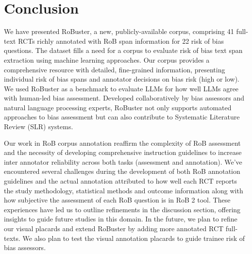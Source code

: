 \documentclass[sn-mathphys,Numbered]{sn-jnl}%
\theoremstyle{thmstyleone}%
\theoremstyle{thmstyletwo}%
\theoremstyle{thmstylethree}%
\begin{document}
\section{Conclusion}
\label{sec:conclusion}
%
We have presented RoBuster, a new, publicly-available corpus, comprising 41 full-text RCTs richly annotated with RoB span information for 22 risk of bias questions.
The dataset fills a need for a corpus to evaluate risk of bias text span extraction using machine learning approaches.
Our corpus provides a comprehensive resource with detailed, fine-grained information, presenting individual risk of bias spans and annotator decisions on bias risk (high or low). 
We used RoBuster as a benchmark to evaluate LLMs for how well LLMs agree with human-led bias assessment.
Developed collaboratively by bias assessors and natural language processing experts, RoBuster not only supports automated approaches to bias assessment but can also contribute to Systematic Literature Review (SLR) systems.


Our work in RoB corpus annotation reaffirm the complexity of RoB assessment and the necessity of developing comprehensive instruction guidelines to increase inter annotator reliability across both tasks (assessment and annotation).
We've encountered several challenges during the development of both RoB annotation guidelines and the actual annotation attributed to how well each RCT reports the study methodology, statistical methods and outcome information along with how subjective the assessment of each RoB question is in RoB 2 tool.
These experiences have led us to outline refinements in the discussion section, offering insights to guide future studies in this domain.
In the future, we plan to refine our visual placards and extend RoBuster by adding more annotated RCT full-texts.
We also plan to test the visual annotation placards to guide trainee risk of bias assessors.
%
%
%
\end{document}
